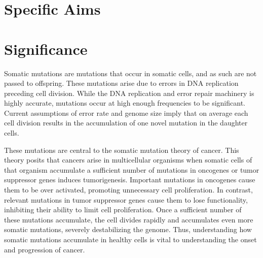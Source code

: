 




% 


\section{Specific Aims} %



\clearpage


\section{Significance}

Somatic mutations are mutations that occur in somatic cells, and as such are not passed to offspring.
These mutations arise due to errors in DNA replication preceding cell division.
While the DNA replication and error repair machinery is highly accurate, mutations occur at high enough frequencies to be significant.
Current assumptions of error rate and genome size imply that on average each cell division results in the accumulation of one novel mutation in the daughter cells.

These mutations are central to the somatic mutation theory of cancer.
This theory posits that cancers arise in multicellular organisms when somatic cells of that organism accumulate a sufficient number of mutations in oncogenes or tumor suppressor genes induces tumorigenesis.
Important mutations in oncogenes cause them to be over activated, promoting unnecessary cell proliferation.
In contrast, relevant mutations in tumor suppressor genes cause them to lose functionality, inhibiting their ability to limit cell proliferation.
Once a sufficient number of these mutations accumulate, the cell divides rapidly and accumulates even more somatic mutations, severely destabilizing the genome.
Thus, understanding how somatic mutations accumulate in healthy cells is vital to understanding the onset and progression of cancer. 

